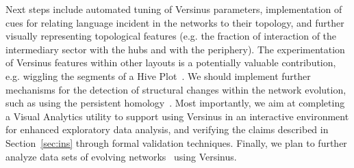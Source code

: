 \documentclass[runningheads]{llncs}
\begin{document}
Next steps include
automated tuning of Versinus parameters, 
implementation of cues for relating language incident in the networks to their topology, and
further visually representing topological features (e.g. the fraction of interaction of the intermediary sector with the hubs and with the periphery).
The experimentation of Versinus features within other layouts is a potentially
valuable contribution, e.g. wiggling the segments of a Hive Plot~\cite{hive}.
We should implement further mechanisms for the detection of structural changes within the network evolution, such as using the persistent homology~\cite{hajij}.
Most importantly, we aim at completing a Visual Analytics utility to support using Versinus in an interactive environment for enhanced exploratory data analysis,
and verifying the claims described in Section~\ref{sec:ins} through formal validation techniques.
Finally, we plan to further analyze data sets of evolving networks~\cite{stab} using Versinus.


%
%
%


%
% 
% 
% 
% 
\end{document}
